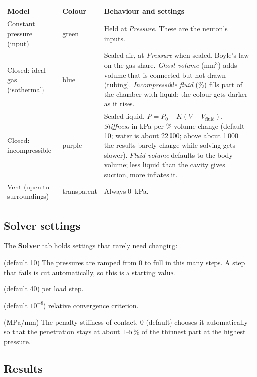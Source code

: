 \documentclass[11pt,a4paper]{article}
\newcommand{\menu}[1]{\textsf{\textbf{#1}}}
\begin{document}
\begin{center}
\begin{tabularx}{\textwidth}{@{}l l X@{}}
\toprule
Model & Colour & Behaviour and settings \\
\midrule
Constant pressure (input) & green & Held at \emph{Pressure}. These are the neuron's inputs. \\
Closed: ideal gas (isothermal) & blue & Sealed air, at \emph{Pressure} when sealed. Boyle's law on the gas share.
  \emph{Ghost volume} (mm$^3$) adds volume that is connected but not drawn (tubing). \emph{Incompressible fluid}
  (\%) fills part of the chamber with liquid; the colour gets darker as it rises. \\
Closed: incompressible & purple & Sealed liquid, $P = P_0 - K(V - V_\text{fluid})$. \emph{Stiffness} in kPa per \%
  volume change (default 10; water is about 22\,000; above about 1\,000 the results barely change while solving
  gets slower). \emph{Fluid volume} defaults to the body volume; less liquid than the cavity gives suction, more
  inflates it. \\
Vent (open to surroundings) & transparent & Always 0~kPa. \\
\bottomrule
\end{tabularx}
\end{center}

\subsection{Solver settings}
\label{sec:solver}

The \menu{Solver} tab holds settings that rarely need changing:
\begin{description}[font=\normalfont\itshape,leftmargin=1.5em]
\item[Load steps] (default 10) The pressures are ramped from 0 to full in this many steps. A step that fails is
  cut automatically, so this is a starting value.
\item[Max Newton iterations] (default 40) per load step.
\item[Residual tolerance] (default $10^{-8}$) relative convergence criterion.
\item[Contact stiffness] (MPa/mm) The penalty stiffness of contact. 0 (default) chooses it automatically so that the
  penetration stays at about 1--5\,\% of the thinnest part at the highest pressure.
\end{description}

\subsection{Results}
\label{sec:results}
\end{document}
